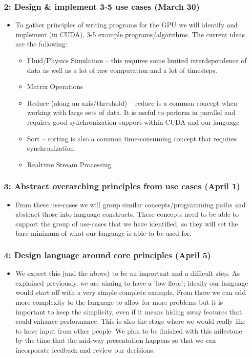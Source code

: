 \documentclass{article}
\begin{document}
\subsubsection*{2: Design \& implement 3-5 use cases (March 30)}
\begin{itemize}
  \item To gather principles of writing programs for the GPU we will identify and implement (in CUDA), 3-5 example programs/algorithms. The current ideas are the following:
    \begin{itemize}
      \item Fluid/Physics Simulation -- this requires some limited interdependence of data as well as a lot of raw computation and a lot of timesteps.
      \item Matrix Operations
      \item Reduce (along an axis/threshold) -- reduce is a common concept when working with large sets of data. It is useful to perform in parallel and requires good synchronization support within CUDA and our language
      \item Sort -- sorting is also a common time-consuming concept that requires synchronization.
      \item Realtime Stream Processing
  \end{itemize}
\end{itemize}

\subsubsection*{3: Abstract overarching principles from use cases (April 1)}
\begin{itemize}
  \item From these use-cases we will group similar concepts/programming paths and abstract those into language constructs. These concepts need to be able to support the group of use-cases that we have identified, so they will set the bare minimum of what our language is able to be used for.
\end{itemize}
  
\subsubsection*{4: Design language around core principles (April 5)}
\begin{itemize}
  \item We expect this (and the above) to be an important and a difficult step. As explained previously, we are aiming to have a 'low floor'; ideally our language would start off with a very simple complete example. From there we can add more complexity to the language to allow for more problems but it is important to keep the simplicity, even if it means hiding away features that could enhance performance. This is also the stage where we would really like to have input from other people. We plan to be finished with this milestone by the time that the mid-way presentation happens so that we can incorporate feedback and review our decisions.
\end{itemize}
 
\end{document}
